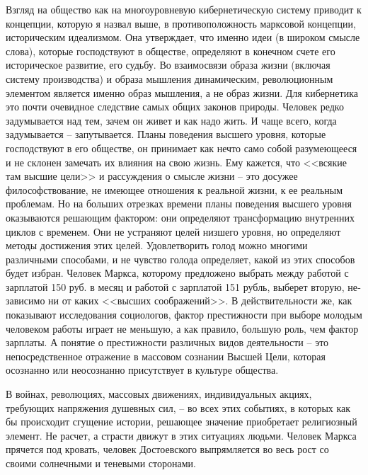 \documentclass{book}
\begin{document}
Взгляд на общество как на многоуровневую кибернетиче­скую систему приводит к концепции, которую я назвал выше, в противоположность марксовой концепции, историческим идеализмом.  Она утверждает, что именно идеи  (в широком смысле слова), которые господствуют в обществе, определяют в конечном счете его историческое развитие, его судьбу. Во взаимосвязи образа жизни (включая систему производства) и образа мышления динамическим, революционным элемен­том является именно образ мышления, а не образ жизни. Для кибернетика это почти очевидное следствие самых общих зако­нов природы. Человек редко задумывается над тем, зачем он живет и как надо жить. И чаще всего, когда задумывается -- запутывается. Планы поведения высшего уровня, которые господствуют в его обществе, он принимает как нечто само собой разумеющееся и не склонен замечать их влияния на свою жизнь. Ему кажется, что <<всякие там высшие цели>> и рассуж­дения о смысле жизни -- это досужее философствование, не имеющее отношения к реальной жизни, к ее реальным 
пробле­мам. Но на больших отрезках времени планы поведения выс­шего уровня оказываются решающим фактором: они опреде­ляют трансформацию внутренних циклов с временем. Они не устраняют целей низшего уровня, но определяют методы до­стижения этих целей. Удовлетворить голод можно многими различными способами, и не  чувство голода определяет, ка­кой из этих способов будет избран. Человек Маркса, которо­му предложено выбрать между работой с зарплатой 150 руб. в месяц и работой с зарплатой 151 рубль, выберет вторую, не­зависимо ни от каких <<высших соображений>>. В действительности же, как показывают исследования социологов, фактор престижности при выборе молодым человеком работы играет не меньшую, а как правило, большую роль, чем фактор зарплаты. А понятие о престижности различных видов деятель­ности -- это непосредственное отражение в массовом сознании Высшей Цели, которая осознанно или неосознанно присутствует в культуре общества.

В войнах, революциях, массовых движениях, индивидуаль­ных акциях, требующих напряжения душевных сил, -- во всех этих событиях, в которых как бы происходит сгущение истории, решающее значение приобретает религиозный элемент. Не расчет, а страсти движут в этих ситуациях людьми. Человек Маркса прячется под кровать, человек Достоевского выпрямляется во весь рост со своими солнечными и теневыми сторонами.
\end{document}
